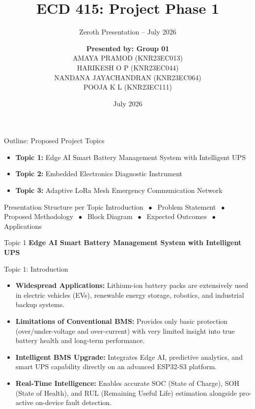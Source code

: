 \documentclass{beamer}
\title[ECD 415: Project Phase 1]{ECD 415: Project Phase 1}
\subtitle{Zeroth Presentation -- July 2026}
\author[Group 01]{%
  \textbf{Presented by: Group 01}\\[6pt]
  AMAYA PRAMOD (KNR23EC013)\\
  HARIKESH O P (KNR23EC044)\\
  NANDANA JAYACHANDRAN (KNR23EC064)\\
  POOJA K L (KNR23EC111)%
}
\institute[GCE Kannur]{%
  \small Guided by: \textbf{Dr. Sajesh Kumar U}\\[6pt]
  \footnotesize Department of Electronics and Communication Engineering \\
  Government College of Engineering, Kannur%
}
\date[]{\color{blue}July 2026}
\begin{document}
\begin{frame}
  \titlepage
\end{frame}

\begin{frame}{Outline: Proposed Project Topics}
\begin{itemize}
  \item \textbf{Topic 1:} Edge AI Smart Battery Management System with Intelligent UPS
  \vspace{0.35cm}
  \item \textbf{Topic 2:} Embedded Electronics Diagnostic Instrument
  \vspace{0.35cm}
  \item \textbf{Topic 3:} Adaptive LoRa Mesh Emergency Communication Network
\end{itemize}
\vspace{0.5cm}
\begin{block}{\centering Presentation Structure per Topic}
  \centering \small Introduction $\;\bullet\;$ Problem Statement $\;\bullet\;$ Proposed Methodology $\;\bullet\;$ Block Diagram $\;\bullet\;$ Expected Outcomes $\;\bullet\;$ Applications
\end{block}
\end{frame}

\begin{frame}
  \begin{block}{\centering \huge Topic 1}
    \vspace{0.3cm}
    \centering \Large \textbf{Edge AI Smart Battery Management System with Intelligent UPS}
    \vspace{0.3cm}
  \end{block}
\end{frame}

\begin{frame}{Topic 1: Introduction}
\begin{itemize}
  \item \textbf{Widespread Applications:} Lithium-ion battery packs are extensively used in electric vehicles (EVs), renewable energy storage, robotics, and industrial backup systems.
  \vspace{0.25cm}
  \item \textbf{Limitations of Conventional BMS:} Provides only basic protection (over/under-voltage and over-current) with very limited insight into true battery health and long-term performance.
  \vspace{0.25cm}
  \item \textbf{Intelligent BMS Upgrade:} Integrates Edge AI, predictive analytics, and smart UPS capability directly on an advanced ESP32-S3 platform.
  \vspace{0.25cm}
  \item \textbf{Real-Time Intelligence:} Enables accurate SOC (State of Charge), SOH (State of Health), and RUL (Remaining Useful Life) estimation alongside pro-active on-device fault detection.
\end{itemize}
\end{frame}
\end{document}
